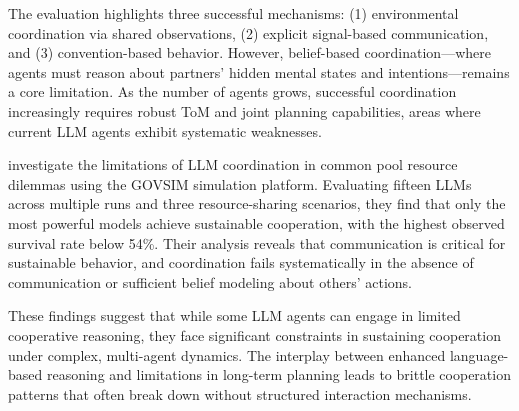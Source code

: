 The evaluation highlights three successful mechanisms: (1) environmental coordination via shared observations, (2) explicit signal-based communication, and (3) convention-based behavior. However, belief-based coordination—where agents must reason about partners' hidden mental states and intentions—remains a core limitation. As the number of agents grows, successful coordination increasingly requires robust ToM and joint planning capabilities, areas where current LLM agents exhibit systematic weaknesses.

\textcite{piatti_cooperate_2025} investigate the limitations of LLM coordination in common pool resource dilemmas using the GOVSIM simulation platform. Evaluating fifteen LLMs across multiple runs and three resource-sharing scenarios, they find that only the most powerful models achieve sustainable cooperation, with the highest observed survival rate below 54\%. Their analysis reveals that communication is critical for sustainable behavior, and coordination fails systematically in the absence of communication or sufficient belief modeling about others' actions.

These findings suggest that while some LLM agents can engage in limited cooperative reasoning, they face significant constraints in sustaining cooperation under complex, multi-agent dynamics. The interplay between enhanced language-based reasoning and limitations in long-term planning leads to brittle cooperation patterns that often break down without structured interaction mechanisms.


% 
% 
% 

